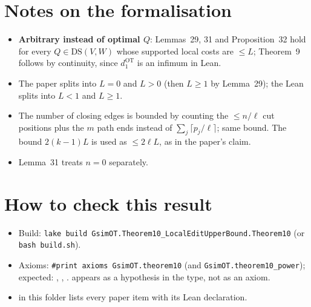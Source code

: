 \section{Notes on the formalisation}
\begin{itemize}
\item \textbf{Arbitrary instead of optimal $Q$}: Lemmas~29, 31 and Proposition~32 hold for every
  $Q\in\mathrm{DS}(V,W)$ whose supported local costs are $\le L$; Theorem~9 follows by continuity, since
  $d_1^{\mathrm{OT}}$ is an infimum in Lean.
\item The paper splits into $L=0$ and $L>0$ (then $L\ge1$ by Lemma~29); the Lean splits into $L<1$ and $L\ge1$.
\item The number of closing edges is bounded by counting the $\le n/\ell$ cut positions plus the $m$ path ends
  instead of $\sum_j\lceil p_j/\ell\rceil$; same bound. The bound $2(k-1)L$ is used as $\le2\ell L$, as in the
  paper's claim.
\item Lemma~31 treats $n=0$ separately.
\end{itemize}

\section{How to check this result}
\begin{itemize}
\item Build: \texttt{lake build GsimOT.Theorem10\_LocalEditUpperBound.Theorem10} (or \texttt{bash build.sh}).
\item Axioms: \texttt{\#print axioms GsimOT.theorem10} (and \texttt{GsimOT.theorem10\_power}); expected:
  , , .  appears as a hypothesis in the
  type, not as an axiom.
\item {} in this folder lists every paper item with its Lean declaration.
\end{itemize}

